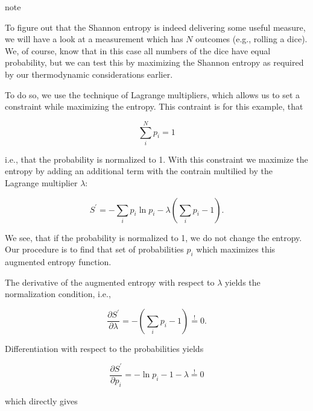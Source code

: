 \documentclass[letterpaper,10pt,english]{sphinxmanual}
\begin{document}
\begin{sphinxadmonition}{note}{}\unskip
\sphinxAtStartPar
{}

\sphinxAtStartPar
To figure out that the Shannon entropy is indeed delivering some useful measure, we will have a look at a measurement which has \(N\) outcomes (e.g., rolling a dice). We, of course, know that in this case all numbers of the dice have equal probability, but we can test this by maximizing the Shannon entropy as required by our thermodynamic considerations earlier.

\sphinxAtStartPar
To do so, we use the technique of Lagrange multipliers, which allows us to set a constraint while maximizing the entropy. This contraint is for this example, that

\sphinxAtStartPar
\begin{equation}
\sum_{i}^{N} p_{i}=1
\end{equation}

\sphinxAtStartPar
i.e., that the probability is normalized to 1. With this constraint we maximize the entropy by adding an additional term with the contrain multilied by the Lagrange multiplier \(\lambda\):

\sphinxAtStartPar
\begin{equation}
S^{\prime}=-\sum_{i} p_{i} \ln p_{i}-\lambda\left(\sum_{i} p_{i}-1\right).
\end{equation}

\sphinxAtStartPar
We see, that if the probability is normalized to 1, we do not change the entropy. Our procedure is to find that set of probabilities \(p_i\) which maximizes this augmented entropy function.

\sphinxAtStartPar
The derivative of the augmented entropy with respect to \(\lambda\) yields the normalization condition, i.e.,

\sphinxAtStartPar
\begin{equation}
\frac{\partial S^{\prime}}{\partial \lambda}=-\left(\sum_{i} p_{i}-1\right)\overset{!}{=} 0.
\end{equation}

\sphinxAtStartPar
Differentiation with respect to the probabilities yields

\sphinxAtStartPar
\begin{equation}
\frac{\partial S^{\prime}}{\partial p_{i}}=-\ln p_{i}-1-\lambda\overset{!}{=} 0
\end{equation}

\sphinxAtStartPar
which directly gives


\end{sphinxadmonition}
\end{document}
